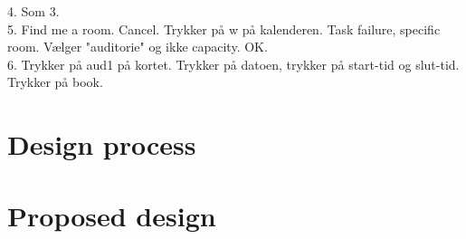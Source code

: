 4. 
Som 3. \\


5.
Find me a room. Cancel. Trykker på w på kalenderen. Task failure, specific room. Vælger "auditorie" og ikke capacity. OK. \\


6.
Trykker på aud1 på kortet. Trykker på datoen, trykker på start-tid og slut-tid. Trykker på book.

\section{Design process}

\section{Proposed design}
